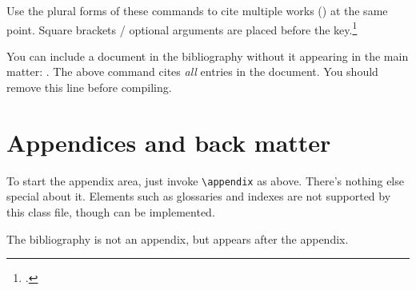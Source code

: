 \documentclass{grattan}
\begin{document}
Use the plural forms of these commands to cite multiple works (\textcites{Piketty2013}{Leigh-2013-BattlersBillionaires}) at the same point.
Square brackets / optional arguments are placed before the key.\footcites{AtkinsonStiglitz1976}[][42]{MirrleesAdamBesleyEtAl2011}

You can include a document in the bibliography without it appearing in the main matter: \nocite{*}. 
The above command cites \emph{all} entries in the document. 
You should remove this line before compiling. 

\appendix

\chapter{Appendices and back matter}\label{chap:appendices}
To start the appendix area, just invoke \verb=\appendix= as above. 
There's nothing else special about it.
Elements such as glossaries and indexes are not supported by this class file, though can be implemented.

The bibliography is not an appendix, but appears after the appendix. 


\printbibliography
\end{document}

